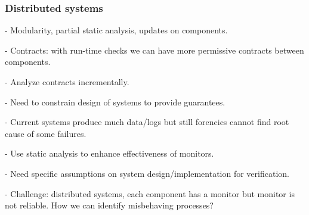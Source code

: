 \documentclass{beamer}
\begin{document}
\begin{frame}
  \frametitle{Distributed systems}

- Modularity, partial static analysis, updates on components.

- Contracts: with run-time checks we can have more permissive contracts
  between components.

- Analyze contracts incrementally.

- Need to constrain design of systems to provide guarantees.

- Current systems produce much data/logs but still forencics cannot find
  root cause of some failures.

- Use static analysis to enhance effectiveness of monitors.

- Need specific assumptions on system design/implementation for verification.

- Challenge: distributed systems, each component has a monitor but monitor
  is not reliable. How we can identify misbehaving processes?

\end{frame}
\end{document}
